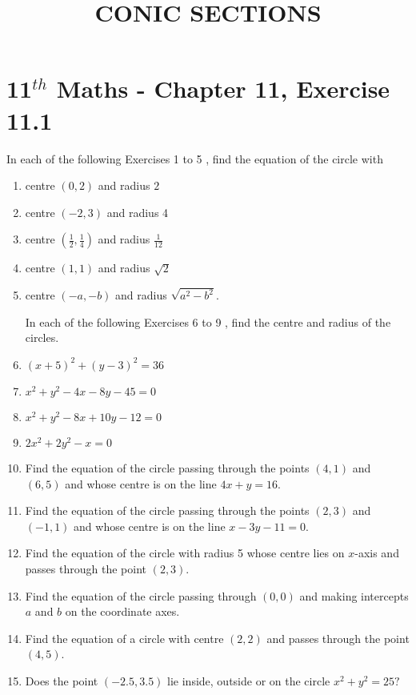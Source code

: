 \documentclass[12pt]{article}
\begin{document}
\title{\textbf{CONIC SECTIONS}}
\maketitle
\begin{center}
\end{center}

\section*{11$^{th}$ Maths - Chapter 11, Exercise 11.1 }
		In each of the following Exercises 1 to 5 , find the equation of 		the circle with

\begin{enumerate}
  \item centre $(0,2)$ and radius $2$

  \item centre $(-2,3)$ and radius 4

  \item centre $\left(\frac{1}{2}, \frac{1}{4}\right)$ and radius $\frac{1}{12}$

  \item centre $(1,1)$ and radius $\sqrt{2}$

  \item centre $(-a,-b)$ and radius $\sqrt{a^{2}-b^{2}}$.


In each of the following Exercises 6 to 9 , find the centre and radius of the circles.
\setcounter{enumi}{5}
\item  $(x+5)^{2}+(y-3)^{2}=36$ 
\item  $x^{2}+y^{2}-4 x-8 y-45=0$
\item  $x^{2}+y^{2}-8 x+10 y-12=0$ 
\item  $2 x^{2}+2 y^{2}-x=0$

  \setcounter{enumi}{9}
  \item Find the equation of the circle passing through the points $(4,1)$ and $(6,5)$ and whose centre is on the line $ 4x+y=16. $

  \item Find the equation of the circle passing through the points $(2,3)$ and $(-1,1)$ and whose centre is on the line $x-3y-11=0$.

  \item Find the equation of the circle with radius 5 whose centre lies on $x$-axis and passes through the point $(2,3)$.

  \item Find the equation of the circle passing through $(0,0)$ and making intercepts $a$ and $b$ on the coordinate axes.

  \item Find the equation of a circle with centre $(2,2)$ and passes through the point $(4,5)$.

  \item Does the point $(-2.5,3.5)$ lie inside, outside or on the circle $x^{2}+y^{2}=25?$

\end{enumerate}
\end{document}
